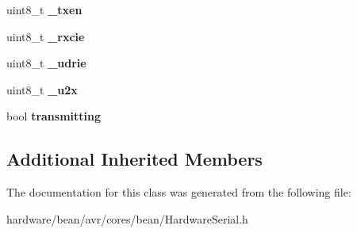 \begin{DoxyCompactItemize}
\item 
\hypertarget{class_hardware_serial_a12a1083bf8f83be14a7f95a94c565d3e}{}uint8\+\_\+t {\bfseries \+\_\+txen}\label{class_hardware_serial_a12a1083bf8f83be14a7f95a94c565d3e}

\item 
\hypertarget{class_hardware_serial_a1cdda80a060ed1f1510d15ab8a6c50f5}{}uint8\+\_\+t {\bfseries \+\_\+rxcie}\label{class_hardware_serial_a1cdda80a060ed1f1510d15ab8a6c50f5}

\item 
\hypertarget{class_hardware_serial_af70c41014e125dd2298b5377271308c9}{}uint8\+\_\+t {\bfseries \+\_\+udrie}\label{class_hardware_serial_af70c41014e125dd2298b5377271308c9}

\item 
\hypertarget{class_hardware_serial_a26a0eb817863234e4cb1958f329bc158}{}uint8\+\_\+t {\bfseries \+\_\+u2x}\label{class_hardware_serial_a26a0eb817863234e4cb1958f329bc158}

\item 
\hypertarget{class_hardware_serial_a3754eb4893f00e90b8965f37c91c0887}{}bool {\bfseries transmitting}\label{class_hardware_serial_a3754eb4893f00e90b8965f37c91c0887}

\end{DoxyCompactItemize}
\subsection*{Additional Inherited Members}


The documentation for this class was generated from the following file\+:\begin{DoxyCompactItemize}
\item 
hardware/bean/avr/cores/bean/Hardware\+Serial.\+h\end{DoxyCompactItemize}
